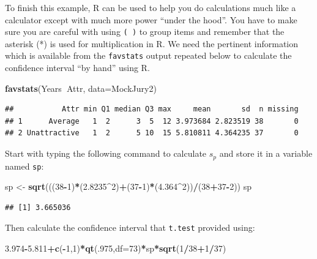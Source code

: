 \documentclass[]{book}
\newenvironment{Shaded}{\begin{snugshade}}{\end{snugshade}}
\newcommand{\KeywordTok}[1]{\textcolor[rgb]{0.13,0.29,0.53}{\textbf{#1}}}
\newcommand{\DataTypeTok}[1]{\textcolor[rgb]{0.13,0.29,0.53}{#1}}
\newcommand{\DecValTok}[1]{\textcolor[rgb]{0.00,0.00,0.81}{#1}}
\newcommand{\FloatTok}[1]{\textcolor[rgb]{0.00,0.00,0.81}{#1}}
\newcommand{\StringTok}[1]{\textcolor[rgb]{0.31,0.60,0.02}{#1}}
\newcommand{\OperatorTok}[1]{\textcolor[rgb]{0.81,0.36,0.00}{\textbf{#1}}}
\newcommand{\NormalTok}[1]{#1}
\theoremstyle{definition}
\theoremstyle{definition}
\theoremstyle{remark}
\begin{document}
To finish this example, R can be used to help you do calculations much
like a calculator except with much more power ``under the hood''. You
have to make sure you are careful with using \texttt{(\ )} to group
items and remember that the asterisk (*) is used for multiplication in
R. We need the pertinent information which is available from the
\texttt{favstats} output repeated below to calculate the confidence
interval ``by hand'' using R.

\begin{Shaded}
\begin{Highlighting}[]
\KeywordTok{favstats}\NormalTok{(Years}\OperatorTok{~}\NormalTok{Attr, }\DataTypeTok{data=}\NormalTok{MockJury2)}
\end{Highlighting}
\end{Shaded}

\begin{verbatim}
##           Attr min Q1 median Q3 max     mean       sd  n missing
## 1      Average   1  2      3  5  12 3.973684 2.823519 38       0
## 2 Unattractive   1  2      5 10  15 5.810811 4.364235 37       0
\end{verbatim}

Start with typing the following command to calculate \(s_p\) and store
it in a variable named \texttt{sp}:

\begin{Shaded}
\begin{Highlighting}[]
\NormalTok{sp <-}\StringTok{ }\KeywordTok{sqrt}\NormalTok{(((}\DecValTok{38}\OperatorTok{-}\DecValTok{1}\NormalTok{)}\OperatorTok{*}\NormalTok{(}\FloatTok{2.8235}\OperatorTok{^}\DecValTok{2}\NormalTok{)}\OperatorTok{+}\NormalTok{(}\DecValTok{37}\OperatorTok{-}\DecValTok{1}\NormalTok{)}\OperatorTok{*}\NormalTok{(}\FloatTok{4.364}\OperatorTok{^}\DecValTok{2}\NormalTok{))}\OperatorTok{/}\NormalTok{(}\DecValTok{38}\OperatorTok{+}\DecValTok{37}\OperatorTok{-}\DecValTok{2}\NormalTok{))}
\NormalTok{sp}
\end{Highlighting}
\end{Shaded}

\begin{verbatim}
## [1] 3.665036
\end{verbatim}

Then calculate the confidence interval that \texttt{t.test} provided
using:

\begin{Shaded}
\begin{Highlighting}[]
\FloatTok{3.974}\OperatorTok{-}\FloatTok{5.811}\OperatorTok{+}\KeywordTok{c}\NormalTok{(}\OperatorTok{-}\DecValTok{1}\NormalTok{,}\DecValTok{1}\NormalTok{)}\OperatorTok{*}\KeywordTok{qt}\NormalTok{(.}\DecValTok{975}\NormalTok{,}\DataTypeTok{df=}\DecValTok{73}\NormalTok{)}\OperatorTok{*}\NormalTok{sp}\OperatorTok{*}\KeywordTok{sqrt}\NormalTok{(}\DecValTok{1}\OperatorTok{/}\DecValTok{38}\OperatorTok{+}\DecValTok{1}\OperatorTok{/}\DecValTok{37}\NormalTok{)}
\end{Highlighting}
\end{Shaded}
\end{document}
